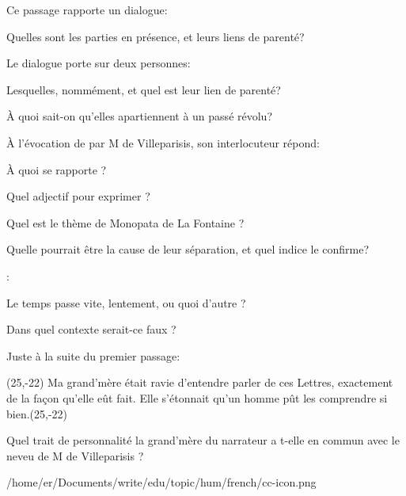 \documentclass[
letterpaper,
12pt
]{article}
\newcommand*\openquote{\makebox(25,-22){\scalebox{5}{``}}}
\newcommand*\closequote{\makebox(25,-22){\scalebox{5}{''}}}
\begin{document}
Ce passage rapporte un dialogue:%
\begin{quest}
  \item Quelles sont les parties en présence, et leurs liens de parenté?
\end{quest}  
Le dialogue porte sur deux personnes:
\begin{quest}
\item Lesquelles, nommément, et quel est leur lien de parenté?
\item À quoi sait-on qu'elles apartiennent à un passé révolu?
\end{quest}
À l'évocation de  par M de Villeparisis, son interlocuteur répond: 
\begin{quest}
\item À quoi se rapporte  ?
\item Quel adjectif pour exprimer  ?
\item Quel est le thème de Monopata de La Fontaine ?
\end{quest}

\begin{quest}
\item Quelle pourrait être la cause de leur séparation, et quel indice le confirme?
\end{quest}  

:
\begin{quest}
\item Le temps passe vite, lentement, ou quoi d'autre ?
\item Dans quel contexte serait-ce faux ?
\end{quest}  

Juste à la suite du premier passage:
\begin{snugshade}\openquote
Ma grand’mère était ravie d’entendre parler de ces Lettres, exactement de la façon qu’elle eût fait. Elle s’étonnait qu’un homme pût les comprendre si bien.\closequote
\end{snugshade}

\begin{quest}
\item Quel trait de personnalité la grand’mère du narrateur a t-elle en commun avec le neveu de M de Villeparisis ?
\end{quest}  


\printbibliography[heading=subbibliography]

\vspace*{\fill}

{/home/er/Documents/write/edu/topic/hum/french/cc-icon.png}
\end{document}
